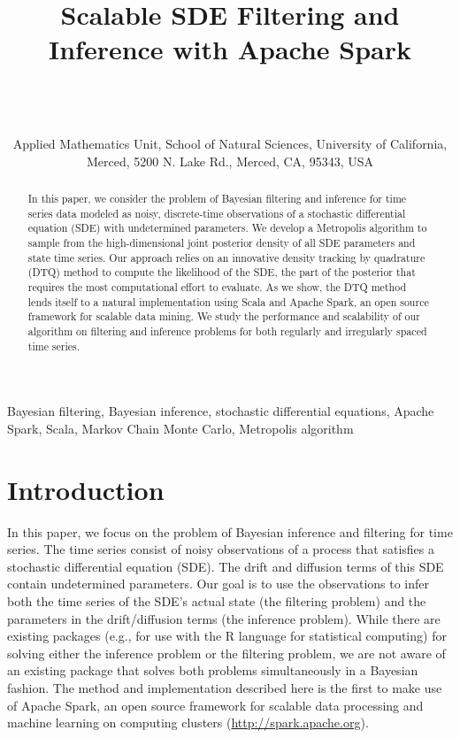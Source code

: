 \documentclass[wcp]{jmlr}
\title[Scalable SDE Filtering and Inference]{Scalable SDE Filtering and Inference with Apache Spark}
\author{\Name{Harish S. Bhat} \Email{hbhat@ucmerced.edu}\\
\Name{R. W. M. A. Madushani} \Email{rmadushani@ucmerced.edu} \\
\Name{Shagun Rawat} \Email{srawat2@ucmerced.edu} \\
\addr Applied Mathematics Unit, School of Natural Sciences, University
of California, Merced, 5200 N. Lake Rd., Merced, CA, 95343, USA}
\begin{document}
\maketitle

\begin{abstract}
In this paper, we consider the problem of Bayesian filtering and
inference for time series data modeled as noisy, discrete-time
observations of a stochastic differential equation (SDE) with undetermined
parameters.  We develop a Metropolis algorithm to sample from the
high-dimensional joint posterior density of all SDE parameters and
state time series.  Our approach relies on an innovative
density tracking by quadrature (DTQ) method to compute the likelihood
of the SDE, the part of the posterior that requires the most
computational effort to evaluate.  As we show, the DTQ method lends
itself to a natural implementation using Scala and Apache Spark, an
open source framework for scalable data mining.  We
study the performance and scalability of our algorithm on filtering and 
inference problems for both regularly and irregularly spaced time series.
\end{abstract}

\begin{keywords}
Bayesian filtering, Bayesian inference, stochastic differential
equations, Apache Spark, Scala, Markov Chain Monte Carlo, Metropolis
algorithm
\end{keywords}

\section{Introduction}
\label{sect:intro}
In this paper, we focus on the problem of Bayesian
inference and filtering for time series.  The time series consist 
of noisy observations of a process that satisfies a stochastic
differential equation (SDE).  The drift and diffusion terms of this
SDE contain undetermined parameters.  Our goal is to use the observations 
to infer both the time series of the SDE's actual state (the filtering
problem) and the parameters in the drift/diffusion terms (the
inference problem).  While there are existing packages (e.g., for use
with the R language for statistical computing) for solving either the
inference problem or the filtering problem, we are not aware of an
existing package that solves both problems simultaneously in a Bayesian
fashion. The method and implementation described here is
the first to make use of Apache Spark, an open source framework for
scalable data processing and machine learning on computing clusters
(\url{http://spark.apache.org}).
\end{document}
